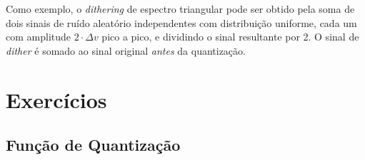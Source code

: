 \documentclass[a4paper,twoside,12pt]{article}
\begin{document}
	Como exemplo, o \textit{dithering} de espectro triangular pode ser obtido pela soma de dois sinais de ruído aleatório independentes com distribuição uniforme, cada um com amplitude $2 \cdot \Delta v$ pico a pico, e dividindo o sinal resultante por 2. O sinal de \textit{dither} é somado ao sinal original \textit{antes} da quantização.

	
	\section{Exercícios}
	
	\subsection{Função de Quantização}
	\label{sec:ex1}
\end{document}

